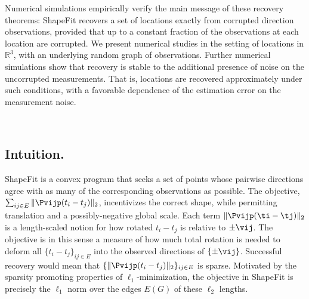 Numerical simulations empirically verify the main message of these recovery theorems: ShapeFit recovers a set of locations exactly from corrupted direction observations, provided that up to a constant fraction of the observations at each location are corrupted. We present numerical studies in the setting of locations in $\mathbb{R}^3$, with an underlying random \erdosrenyi graph of observations. Further numerical simulations show that recovery is stable to the additional presence of noise on the uncorrupted measurements.  That is, locations are recovered approximately under such conditions, with a favorable dependence of the estimation error on the measurement noise. 

\



\subsection{Intuition.} \label{sec-motivation}

ShapeFit is a convex program that seeks a set of points whose pairwise directions agree with as many of the corresponding observations as possible.  %
The objective, $\sum_{ij \in E} \| \Pvijp (t_i - t_j) \|_2$, incentivizes the correct shape, while permitting translation and a possibly-negative global scale.  Each term $\|\Pvijp (\ti - \tj)\|_2$ is a length-scaled notion for how rotated $t_i - t_j$ is relative to $\pm \vij$.  The objective is in this sense a measure of how much total rotation is needed to deform all $\{t_i - t_j\}_{ij \in E}$ into the observed directions of $\{\pm \vij\}$.  Successful recovery would mean that $\{\|\Pvijp (t_i - t_j)\|_2\}_{ij \in E}$ is sparse.  Motivated by the sparsity promoting properties of $\ell_1$-minimization, the objective in ShapeFit is precisely the $\ell_1$ norm over the edges $E(G)$ of these $\ell_2$ lengths.  

